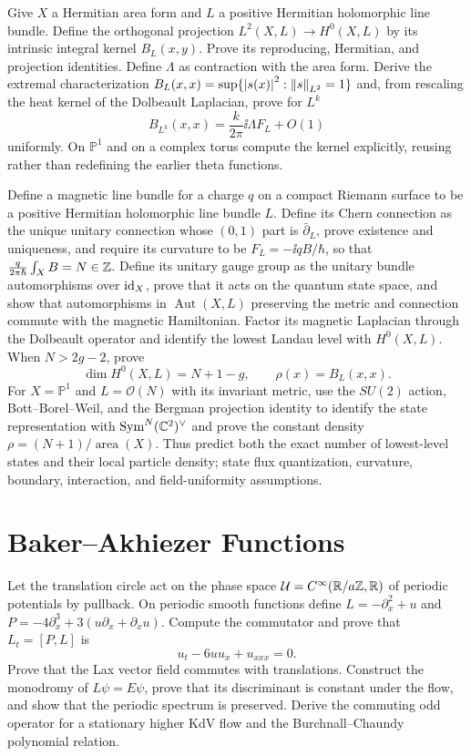 \begin{exercise}
Give $X$ a Hermitian area form and $L$ a positive Hermitian holomorphic line
bundle.  Define the orthogonal projection
$L^2(X,L)\to H^0(X,L)$ by its intrinsic integral kernel $B_L(x,y)$.
Prove its reproducing, Hermitian, and projection identities.  Define
$\Lambda$ as contraction with the area form.  Derive the
extremal characterization
$B_L(x,x)=\sup\{\left\lvert s(x)\right\rvert^2:\left\lVert s\right\rVert_{L^2}=1\}$ and, from rescaling the heat
kernel of the Dolbeault Laplacian, prove for $L^k$
\[
 B_{L^k}(x,x)=\frac{k}{2\pi}\ii\Lambda F_L+O(1)
\]
uniformly.  On $\mathbb P^1$ and on a complex torus compute the kernel
explicitly, reusing rather than redefining the earlier theta functions.
\end{exercise}

\begin{exercise}
Define a magnetic line bundle for a charge $q$ on a compact Riemann surface
to be a positive Hermitian holomorphic line bundle $L$.  Define its Chern
connection as the unique unitary connection whose $(0,1)$ part is
$\bar\partial_L$, prove existence and uniqueness, and require its curvature
to be $F_L=-\ii qB/\hbar$, so that
$\frac{q}{2\pi\hbar}\int_XB=N\in\mathbb Z$.  Define its unitary gauge group as the
unitary bundle automorphisms over $\operatorname{id}_X$, prove that it acts on the quantum
state space, and show that automorphisms in
$\operatorname{Aut}(X,L)$ preserving the metric and connection commute with
the magnetic Hamiltonian.  Factor its magnetic
Laplacian through the Dolbeault operator and identify the lowest Landau level
with $H^0(X,L)$.  When $N>2g-2$, prove
\[
 \dim H^0(X,L)=N+1-g,\qquad
 \rho(x)=B_L(x,x).
\]
For $X=\mathbb P^1$ and $L=\mathcal O(N)$ with its invariant metric, use the
$SU(2)$ action, Bott--Borel--Weil, and the Bergman projection identity to
identify the state representation with
$\operatorname{Sym}^N(\mathbb C^2)^\vee$ and prove the constant density
$\rho=(N+1)/\operatorname{area}(X)$.  Thus predict both the exact number of
lowest-level states and their local particle density; state flux
quantization, curvature, boundary, interaction, and field-uniformity
assumptions.
\end{exercise}

\section{Baker--Akhiezer Functions}

\begin{exercise}
Let the translation circle act on the phase space
$\mathcal U=C^\infty(\mathbb R/a\mathbb Z,\mathbb R)$ of periodic potentials by pullback.  On
periodic smooth functions define
$L=-\partial_x^2+u$ and
$P=-4\partial_x^3+3(u\partial_x+\partial_xu)$.  Compute the commutator and
prove that $L_t=[P,L]$ is
\[
 u_t-6uu_x+u_{xxx}=0.
\]
Prove that the Lax vector field commutes with translations.  Construct the
monodromy of $L\psi=E\psi$, prove that its discriminant is
constant under the flow, and show that the periodic spectrum is preserved.
Derive the commuting odd operator for a stationary higher KdV flow and the
Burchnall--Chaundy polynomial relation.
\end{exercise}

